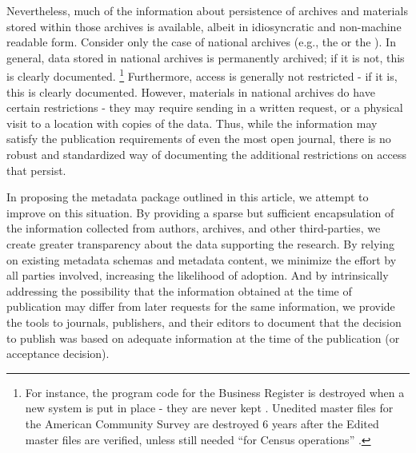 Nevertheless, much of the information about persistence of archives and
materials stored within those archives is available, albeit in
idiosyncratic and non-machine readable form. Consider only the case of
national archives (e.g., the  or the ). 
In general, data stored in national archives is
permanently archived; if it is not, this is clearly documented.%
\footnote{For instance, the program code for the Business Register is destroyed when a new system is put in place - they are never kept \parencite{U.S.CensusBureauRecordsControlSchedule2009}. Unedited master files for the American Community Survey are destroyed 6 years after the Edited master files are verified, unless still needed ``for Census operations'' \parencite{U.S.CensusBureauRecordsControlSchedule1999}.}
Furthermore, access is generally not restricted - if it is, this is
clearly documented. However, materials in national archives do have
certain restrictions - they may require sending in a written request, or
a physical visit to a location with copies of the data. Thus, while the
information may satisfy the publication requirements of even the most
open journal, there is no robust and standardized way of documenting the
additional restrictions on access that persist. 

In proposing the
metadata package outlined in this article, we attempt to improve on this
situation. By providing a sparse but sufficient encapsulation of the
information collected from authors, archives, and other third-parties,
we create greater transparency about the data supporting the research.
By relying on existing metadata schemas and metadata content, we
minimize the effort by all parties involved, increasing the likelihood
of adoption. And by intrinsically addressing the possibility that the
information obtained at the time of publication may differ from later
requests for the same information, we provide the tools to journals,
publishers, and their editors to document that the decision to publish
was based on adequate information at the time of the publication (or
acceptance decision).

